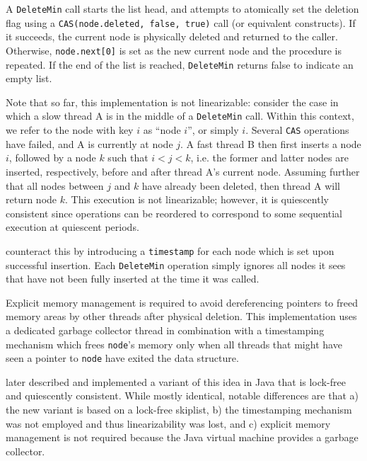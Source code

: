 \documentclass[a4paper,10pt]{article}
\begin{document}
A \lstinline|DeleteMin| call starts the list head, and attempts to atomically set
the deletion flag using a \lstinline|CAS(node.deleted, false, true)| call (or equivalent constructs).
If it succeeds, the current node is physically deleted and returned to the caller. Otherwise,
\lstinline|node.next[0]| is set as the new current node and the procedure is repeated.
If the end of the list is reached, \lstinline|DeleteMin| returns false to indicate an empty list.

Note that so far, this implementation is not linearizable: consider the case in which a
slow thread A is in the middle of a \lstinline|DeleteMin| call. Within this context, we refer to 
the node with key $i$ as ``node $i$'', or simply $i$. Several \lstinline|CAS|
operations have failed, and A is currently at node $j$.
A fast thread B then first inserts a node $i$, followed by a node $k$ such that
$i < j < k$, i.e. the former and latter nodes are inserted, respectively, before and after
thread A's current node. Assuming further that all nodes between $j$ and $k$ have already
been deleted, then thread A will return node $k$. This execution is not linearizable; however,
it is quiescently consistent since operations can be reordered to correspond to some sequential
execution at quiescent periods.

\citeauthor{shavit2000skiplist} counteract this by introducing a \lstinline|timestamp| for each
node which is set upon successful insertion. Each \lstinline|DeleteMin| operation 
simply ignores all nodes it sees that have not been fully inserted at the time it was called.


Explicit memory management is required to avoid dereferencing pointers to freed memory areas
by other threads after physical deletion. This implementation uses a dedicated garbage collector
thread in combination with a timestamping mechanism which frees \lstinline|node|'s memory only
when all threads that might have seen a pointer to \lstinline|node| have exited the data structure.

\citeauthor{herlihy2012art} \cite{herlihy2012art} later described and implemented a variant of this idea 
in Java that is lock-free and quiescently consistent. While mostly identical, notable differences are
that a) the new variant is based on a lock-free skiplist, b) the timestamping mechanism was not
employed and thus linearizability was lost, and c) explicit memory management is not required
because the Java virtual machine provides a garbage collector.
\end{document}
